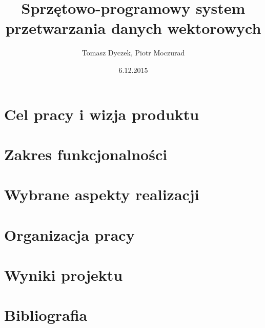 \documentclass[12pt,twoside]{report}
\title{Sprzętowo-programowy system przetwarzania danych wektorowych}
\author{Tomasz Dyczek, Piotr Moczurad}
\date{6.12.2015}
\begin{document}
	
	\tableofcontents
	
	  \chapter{Cel pracy i wizja produktu}
    

    \chapter{Zakres funkcjonalności}
    

    \chapter{Wybrane aspekty realizacji}
    

    \chapter{Organizacja pracy}
    

    \chapter{Wyniki projektu}
    

    \chapter{Bibliografia}
    
	
\end{document}

